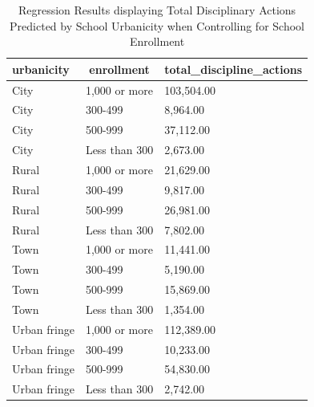 \documentclass[
  man, fleqn, noextraspace]{apa6}
\begin{document}
\begin{table}[tbp]
\begin{center}
\begin{threeparttable}
\caption{\label{tab:model tables}Regression Results displaying Total Disciplinary Actions Predicted by School Urbanicity when Controlling for School Enrollment}
\begin{tabular}{lll}
\toprule
urbanicity & \multicolumn{1}{c}{enrollment} & \multicolumn{1}{c}{total\_discipline\_actions}\\
\midrule
City & 1,000 or more & 103,504.00\\
City & 300-499 & 8,964.00\\
City & 500-999 & 37,112.00\\
City & Less than 300 & 2,673.00\\
Rural & 1,000 or more & 21,629.00\\
Rural & 300-499 & 9,817.00\\
Rural & 500-999 & 26,981.00\\
Rural & Less than 300 & 7,802.00\\
Town & 1,000 or more & 11,441.00\\
Town & 300-499 & 5,190.00\\
Town & 500-999 & 15,869.00\\
Town & Less than 300 & 1,354.00\\
Urban fringe & 1,000 or more & 112,389.00\\
Urban fringe & 300-499 & 10,233.00\\
Urban fringe & 500-999 & 54,830.00\\
Urban fringe & Less than 300 & 2,742.00\\
\bottomrule
\end{tabular}
\end{threeparttable}
\end{center}
\end{table}
\end{document}
